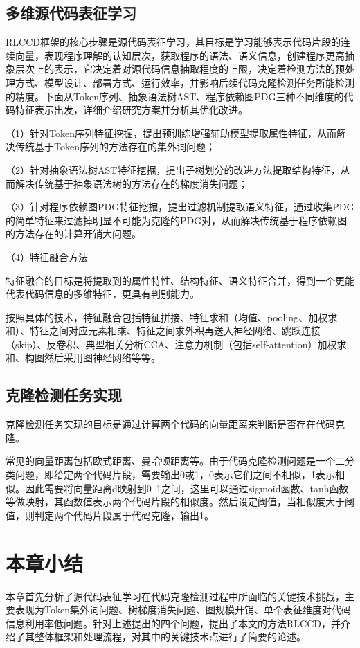 \subsection{多维源代码表征学习}
\label{subsec:Representation}
RLCCD框架的核心步骤是源代码表征学习，其目标是学习能够表示代码片段的连续向量，表现程序理解的认知层次，获取程序的语法、语义信息，创建程序更高抽象层次上的表示，它决定着对源代码信息抽取程度的上限，决定着检测方法的预处理方式、模型设计、部署方式、运行效率，并影响后续代码克隆检测任务所能检测的精度。下面从Token序列、抽象语法树AST、程序依赖图PDG三种不同维度的代码特征表示出发，详细介绍研究方案并分析其优化改进。

（1）针对Token序列特征挖掘，提出预训练增强辅助模型提取属性特征，从而解决传统基于Token序列的方法存在的集外词问题；

（2）针对抽象语法树AST特征挖掘，提出子树划分的改进方法提取结构特征，从而解决传统基于抽象语法树的方法存在的梯度消失问题；

（3）针对程序依赖图PDG特征挖掘，提出过滤机制提取语义特征，通过收集PDG的简单特征来过滤掉明显不可能为克隆的PDG对，从而解决传统基于程序依赖图的方法存在的计算开销大问题。

（4）特征融合方法

特征融合的目标是将提取到的属性特性、结构特征、语义特征合并，得到一个更能代表代码信息的多维特征，更具有判别能力。

按照具体的技术，特征融合包括特征拼接、特征求和（均值、pooling、加权求和）、特征之间对应元素相乘、特征之间求外积再送入神经网络、跳跃连接（skip）、反卷积、典型相关分析CCA、注意力机制（包括self-attention）加权求和、构图然后采用图神经网络等等。

\subsection{克隆检测任务实现}
\label{subsec:Clone detection}
克隆检测任务实现的目标是通过计算两个代码的向量距离来判断是否存在代码克隆。


常见的向量距离包括欧式距离、曼哈顿距离等。由于代码克隆检测问题是一个二分类问题，即给定两个代码片段，需要输出0或1，0表示它们之间不相似，1表示相似。因此需要将向量距离d映射到0~1之间，这里可以通过sigmoid函数、tanh函数等做映射，其函数值表示两个代码片段的相似度。然后设定阈值，当相似度大于阈值，则判定两个代码片段属于代码克隆，输出1。

\section{本章小结}
\label{sec:Summary2}
本章首先分析了源代码表征学习在代码克隆检测过程中所面临的关键技术挑战，主要表现为Token集外词问题、树梯度消失问题、图规模开销、单个表征维度对代码信息利用率低问题。针对上述提出的四个问题，提出了本文的方法RLCCD，并介绍了其整体框架和处理流程，对其中的关键技术点进行了简要的论述。

